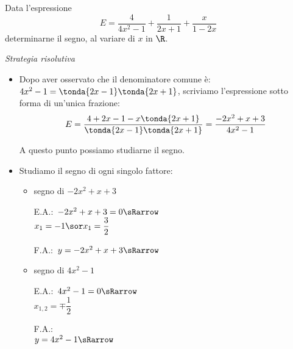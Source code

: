 \begin{esempio}
Data l'espressione 
\[E=\dfrac{4}{4x^2-1}+\dfrac {1}{2x+1}+\dfrac{x}{1-2x}\]
determinarne il segno, al variare di \(x\) in \(\R\).

\newpage %

\emph{Strategia risolutiva}
\begin{itemize}

\item Dopo aver osservato che il denominatore comune è:
\(4x^2-1 =\tonda{2x-1}\tonda{2x+1}\), scriviamo 
l'espressione sotto forma di un'unica frazione:
\[E=\dfrac{4+2x-1 - x \tonda{2x+1}}{\tonda{2x-1}\tonda{2x+1}} =
\dfrac{-2x^2+x+3}{4x^2-1}\]

A questo punto possiamo studiarne il segno.

 \item Studiamo il segno di ogni singolo fattore:

\begin{itemize}

 \item  segno di \(-2x^2+x+3\)\\
 \begin{minipage}{.35\textwidth}
  E.A.:~\(-2x^2+x+3=0 \sRarrow\)\\
  \(x_1=-1 \sor x_1=\dfrac{3}{2}\)
  \vspace{1.8em}
 \end{minipage}
 \begin{minipage}{.25\textwidth}
  F.A.:~\(y=-2x^2+x+3 \sRarrow \)
  \vspace{1.8em}
 \end{minipage}
 \begin{minipage}{.38\textwidth}
  \begin{inaccessibleblock}
\end{inaccessibleblock}
 \end{minipage}
 
 \item segno di \(4x^2-1\)\\
 \begin{minipage}{.35\textwidth}
  E.A.:~\(4x^2-1=0 \sRarrow \) \\
  \(x_{1,2}=\mp\dfrac{1}{2}\)
 \end{minipage}
 \begin{minipage}{.25\textwidth}
  F.A.:\\
  \(y=4x^2-1 \sRarrow\)
 \end{minipage}
 \begin{minipage}{.38\textwidth}
  \begin{inaccessibleblock}
\end{inaccessibleblock}
 \end{minipage}
 

\end{itemize}
\end{itemize}
\end{esempio}
